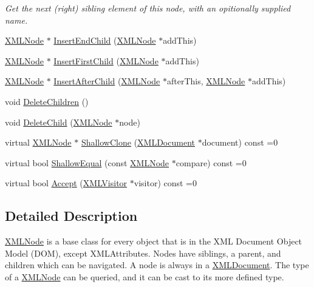 \begin{DoxyCompactItemize}
\begin{DoxyCompactList}\small\item\em Get the next (right) sibling element of this node, with an opitionally supplied name. \end{DoxyCompactList}\item 
\hyperlink{classtinyxml2_1_1_x_m_l_node}{X\-M\-L\-Node} $\ast$ \hyperlink{classtinyxml2_1_1_x_m_l_node_a5fe0467674fae91e75ff38a2059c148b}{Insert\-End\-Child} (\hyperlink{classtinyxml2_1_1_x_m_l_node}{X\-M\-L\-Node} $\ast$add\-This)
\item 
\hyperlink{classtinyxml2_1_1_x_m_l_node}{X\-M\-L\-Node} $\ast$ \hyperlink{classtinyxml2_1_1_x_m_l_node_ab38d7acc954382b8f4358b19d07fda83}{Insert\-First\-Child} (\hyperlink{classtinyxml2_1_1_x_m_l_node}{X\-M\-L\-Node} $\ast$add\-This)
\item 
\hyperlink{classtinyxml2_1_1_x_m_l_node}{X\-M\-L\-Node} $\ast$ \hyperlink{classtinyxml2_1_1_x_m_l_node_afc42f9c369f511c2b7951c1c2be8e051}{Insert\-After\-Child} (\hyperlink{classtinyxml2_1_1_x_m_l_node}{X\-M\-L\-Node} $\ast$after\-This, \hyperlink{classtinyxml2_1_1_x_m_l_node}{X\-M\-L\-Node} $\ast$add\-This)
\item 
void \hyperlink{classtinyxml2_1_1_x_m_l_node_a1366a62975a9bd4c642d9ac72bb18795}{Delete\-Children} ()
\item 
void \hyperlink{classtinyxml2_1_1_x_m_l_node_a4d6c682551a30aa876301d9b5d9eb119}{Delete\-Child} (\hyperlink{classtinyxml2_1_1_x_m_l_node}{X\-M\-L\-Node} $\ast$node)
\item 
virtual \hyperlink{classtinyxml2_1_1_x_m_l_node}{X\-M\-L\-Node} $\ast$ \hyperlink{classtinyxml2_1_1_x_m_l_node_ae565db17190bb2bb78121d9504161652}{Shallow\-Clone} (\hyperlink{classtinyxml2_1_1_x_m_l_document}{X\-M\-L\-Document} $\ast$document) const =0
\item 
virtual bool \hyperlink{classtinyxml2_1_1_x_m_l_node_a6d44ea557ea23ee19668984562d86cfc}{Shallow\-Equal} (const \hyperlink{classtinyxml2_1_1_x_m_l_node}{X\-M\-L\-Node} $\ast$compare) const =0
\item 
virtual bool \hyperlink{classtinyxml2_1_1_x_m_l_node_a22a4129c1b347686a3579664d9278cce}{Accept} (\hyperlink{classtinyxml2_1_1_x_m_l_visitor}{X\-M\-L\-Visitor} $\ast$visitor) const =0
\end{DoxyCompactItemize}


\subsection{Detailed Description}
\hyperlink{classtinyxml2_1_1_x_m_l_node}{X\-M\-L\-Node} is a base class for every object that is in the X\-M\-L Document Object Model (D\-O\-M), except X\-M\-L\-Attributes. Nodes have siblings, a parent, and children which can be navigated. A node is always in a \hyperlink{classtinyxml2_1_1_x_m_l_document}{X\-M\-L\-Document}. The type of a \hyperlink{classtinyxml2_1_1_x_m_l_node}{X\-M\-L\-Node} can be queried, and it can be cast to its more defined type.

